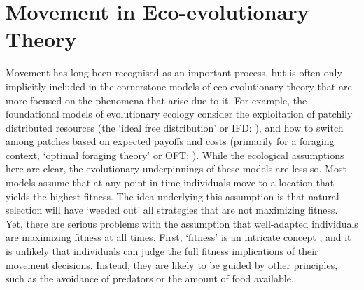 \section*{Movement in Eco-evolutionary Theory}

Movement has long been recognised as an important process, but is often only implicitly included in the cornerstone models of eco-evolutionary theory that are more focused on the phenomena that arise due to it.
For example, the foundational models of evolutionary ecology consider the exploitation of patchily distributed resources (the `ideal free distribution' or IFD: \cite{fretwell1970}), and how to switch among patches based on expected payoffs and costs (primarily for a foraging context, `optimal foraging theory' or OFT; \cite{charnov1976}).
While the ecological assumptions here are clear, the evolutionary underpinnings of these models are less so.
Most models assume that at any point in time individuals move to a location that yields the highest fitness.
The idea underlying this assumption is that natural selection will have `weeded out' all strategies that are not maximizing fitness.
Yet, there are serious problems with the assumption that well-adapted individuals are maximizing fitness at all times. 
First, `fitness' is an intricate concept \parencite{brommer2000}, and it is unlikely that individuals can judge the full fitness implications of their movement decisions. 
Instead, they are likely to be guided by other principles, such as the avoidance of predators or the amount of food available. 
